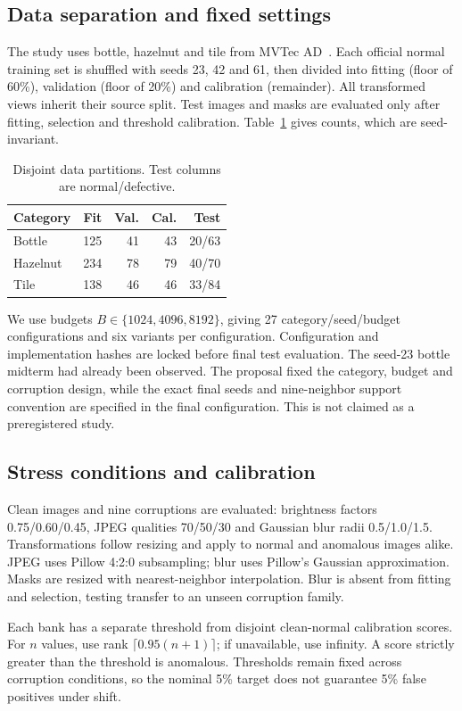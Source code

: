 \documentclass[10pt,twocolumn,letterpaper]{article}
\begin{document}
\subsection{Data separation and fixed settings}
The study uses bottle, hazelnut and tile from MVTec AD~\cite{bergmann2019}. Each official normal training set is shuffled with seeds 23, 42 and 61, then divided into fitting (floor of 60\%), validation (floor of 20\%) and calibration (remainder). All transformed views inherit their source split. Test images and masks are evaluated only after fitting, selection and threshold calibration. Table~\ref{tab:splits} gives counts, which are seed-invariant.
\begin{table}[t]
\centering\small
\caption{Disjoint data partitions. Test columns are normal/defective.}
\label{tab:splits}
\begin{tabular}{lrrrr}\toprule
Category & Fit & Val. & Cal. & Test\\\midrule
Bottle & 125 & 41 & 43 & 20/63\\
Hazelnut & 234 & 78 & 79 & 40/70\\
Tile & 138 & 46 & 46 & 33/84\\\bottomrule
\end{tabular}
\end{table}

We use budgets $B\in\{1024,4096,8192\}$, giving 27 category/seed/budget configurations and six variants per configuration. Configuration and implementation hashes are locked before final test evaluation. The seed-23 bottle midterm had already been observed. The proposal fixed the category, budget and corruption design, while the exact final seeds and nine-neighbor support convention are specified in the final configuration. This is not claimed as a preregistered study.

\subsection{Stress conditions and calibration}
Clean images and nine corruptions are evaluated: brightness factors 0.75/0.60/0.45, JPEG qualities 70/50/30 and Gaussian blur radii 0.5/1.0/1.5. Transformations follow resizing and apply to normal and anomalous images alike. JPEG uses Pillow 4:2:0 subsampling; blur uses Pillow's Gaussian approximation. Masks are resized with nearest-neighbor interpolation. Blur is absent from fitting and selection, testing transfer to an unseen corruption family.

Each bank has a separate threshold from disjoint clean-normal calibration scores. For $n$ values, use rank $\lceil0.95(n+1)\rceil$; if unavailable, use infinity. A score strictly greater than the threshold is anomalous. Thresholds remain fixed across corruption conditions, so the nominal 5\% target does not guarantee 5\% false positives under shift.
\end{document}
